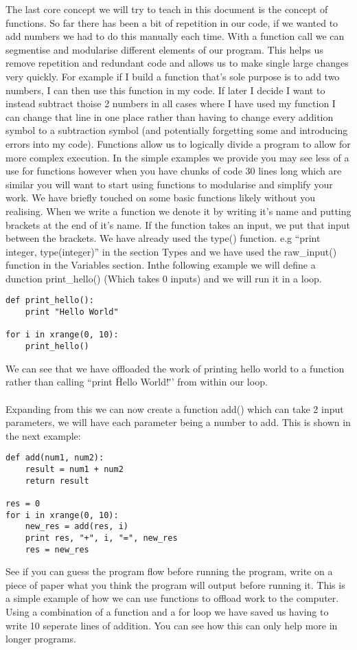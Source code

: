 \documentclass[twocolumn]{article}
\begin{document}
The last core concept we will try to teach in this document is the concept of functions. So far there has been a bit of repetition in our code, if we wanted to add numbers we had to do this manually each time. With a function call we can segmentise and modularise different elements of our program. This helps us remove repetition and redundant code and allows us to make single large changes very quickly. For example if I build a function that's sole purpose is to add two numbers, I can then use this function in my code. If later I decide I want to instead subtract thoise 2 numbers in all cases where I have used my function I can change that line in one place rather than having to change every addition symbol to a subtraction symbol (and potentially forgetting some and introducing errors into my code). Functions allow us to logically divide a program to allow for more complex execution. In the simple examples we provide you may see less of a use for functions however when you have chunks of code 30 lines long which are similar you will want to start using functions to modularise and simplify your work. We have briefly touched on some basic functions likely without you realising. When we write a function we denote it by writing it's name and putting brackets at the end of it's name. If the function takes an input, we put that input between the brackets. We have already used the type() function. e.g ``print integer, type(integer)'' in the section Types and we have used the raw\_input() function in the Variables section. Inthe following example we will define a dunction print\_hello() (Which takes 0 inputs) and we will run it in a loop.
\begin{lstlisting}
def print_hello():
	print "Hello World"

for i in xrange(0, 10):
	print_hello()
\end{lstlisting}
We can see that we have offloaded the work of printing hello world to a function rather than calling ``print \"Hello World!\"'' from within our loop.\\
\\
Expanding from this we can now create a function add() which can take 2 input parameters, we will have each parameter being a number to add. This is shown in the next example:
\begin{lstlisting}
def add(num1, num2):
	result = num1 + num2
	return result

res = 0
for i in xrange(0, 10):
	new_res = add(res, i)
	print res, "+", i, "=", new_res
	res = new_res
\end{lstlisting}
See if you can guess the program flow before running the program, write on a piece of paper what you think the program will output before running it. This is a simple example of how we can use functions to offload work to the computer. Using a combination of a function and a for loop we have saved us having to write 10 seperate lines of addition. You can see how this can only help more in longer programs.
\end{document}
